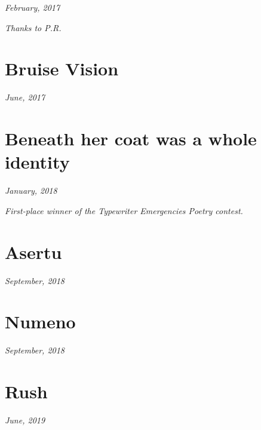 \documentclass[11pt]{memoir}
\begin{document}
    \hfill\textit{February, 2017}

    

    \textit{Thanks to P.R.}
    \newpage


    \section*{Bruise Vision}

    \hfill\textit{June, 2017}

    
    \newpage


    \section*{Beneath her coat was a whole identity}

    \hfill\textit{January, 2018}

    

    \textit{First-place winner of the Typewriter Emergencies Poetry contest.}
    \newpage


    \section*{Asertu}

    \hfill\textit{September, 2018}

    
    \newpage


    \section*{Numeno}

    \hfill\textit{September, 2018}

    
    \newpage


    \section*{Rush}

    \hfill\textit{June, 2019}

    
    \newpage

\end{document}
